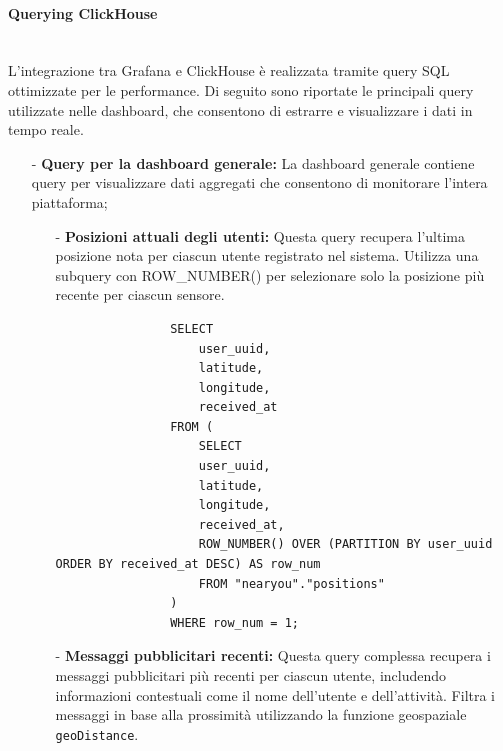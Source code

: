 \documentclass[10pt]{article}
\newcommand{\myparagraph}[1]{\paragraph{#1}\mbox{}\\}
\begin{document}
        \myparagraph{Querying ClickHouse}
        L'integrazione tra Grafana e ClickHouse è realizzata tramite query SQL ottimizzate per le performance. Di seguito sono riportate le principali query utilizzate nelle dashboard, che consentono di estrarre e visualizzare i dati in tempo reale.
        \begin{itemize}

        \item[-] \textbf{Query per la dashboard generale:} 
        La dashboard generale contiene query per visualizzare dati aggregati che consentono di monitorare l'intera piattaforma;

            \begin{itemize}
                \item[-] \textbf{Posizioni attuali degli utenti:}
                Questa query recupera l'ultima posizione nota per ciascun utente registrato nel sistema. Utilizza una subquery con ROW\_NUMBER() per selezionare solo la posizione più recente per ciascun sensore.
                
                \begin{lstlisting}
                SELECT 
                    user_uuid, 
                    latitude, 
                    longitude, 
                    received_at
                FROM (
                    SELECT 
                    user_uuid, 
                    latitude, 
                    longitude, 
                    received_at,
                    ROW_NUMBER() OVER (PARTITION BY user_uuid ORDER BY received_at DESC) AS row_num
                    FROM "nearyou"."positions"
                ) 
                WHERE row_num = 1;
                \end{lstlisting}
                
                \item[-] \textbf{Messaggi pubblicitari recenti:}
                Questa query complessa recupera i messaggi pubblicitari più recenti per ciascun utente, includendo informazioni contestuali come il nome dell'utente e dell'attività. Filtra i messaggi in base alla prossimità utilizzando la funzione geospaziale \texttt{geoDistance}.
                

\end{itemize}
\end{itemize}
\end{document}
